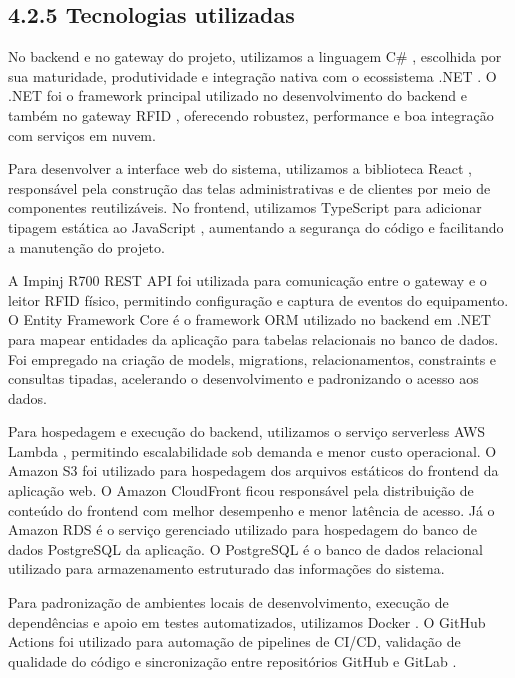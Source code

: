 \hypertarget{__RefHeading___Toc4811_3118176633}{}
\subsection*{4.2.5 Tecnologias utilizadas}
\label{ages-iii:text-h-0085}

No backend e no gateway do projeto, utilizamos a linguagem C\# \cite{ages-iii-csharp}, escolhida por sua maturidade, produtividade e integração nativa com o ecossistema .NET \cite{ages-iii-dotnet}.
O .NET foi o framework principal utilizado no desenvolvimento do backend e também no gateway RFID \cite{ages-iii-rfid-nist}, oferecendo robustez, performance e boa integração com serviços em nuvem.

Para desenvolver a interface web do sistema, utilizamos a biblioteca React \cite{ages-iii-react}, responsável pela construção das telas administrativas e de clientes por meio de componentes reutilizáveis.
No frontend, utilizamos TypeScript \cite{ages-iii-typescript} para adicionar tipagem estática ao JavaScript \cite{ages-iii-javascript}, aumentando a segurança do código e facilitando a manutenção do projeto.

A Impinj R700 REST API \cite{ages-iii-impinj-iot-interface} foi utilizada para comunicação entre o gateway e o leitor RFID físico, permitindo configuração e captura de eventos do equipamento.
O Entity Framework Core \cite{ages-iii-entity-framework} é o framework ORM utilizado no backend em .NET para mapear entidades da aplicação para tabelas relacionais no banco de dados. Foi empregado na criação de models, migrations, relacionamentos, constraints e consultas tipadas, acelerando o desenvolvimento e padronizando o acesso aos dados.

Para hospedagem e execução do backend, utilizamos o serviço serverless AWS Lambda \cite{ages-iii-aws-lambda}, permitindo escalabilidade sob demanda e menor custo operacional.
O Amazon S3 \cite{ages-iii-s3} foi utilizado para hospedagem dos arquivos estáticos do frontend da aplicação web.
O Amazon CloudFront \cite{ages-iii-cloudfront} ficou responsável pela distribuição de conteúdo do frontend com melhor desempenho e menor latência de acesso.
Já o Amazon RDS \cite{ages-iii-rds} é o serviço gerenciado utilizado para hospedagem do banco de dados PostgreSQL \cite{ages-iii-postgresql} da aplicação.
O PostgreSQL é o banco de dados relacional utilizado para armazenamento estruturado das informações do sistema.

Para padronização de ambientes locais de desenvolvimento, execução de dependências e apoio em testes automatizados, utilizamos Docker \cite{ages-iii-docker}.
O GitHub Actions \cite{ages-iii-github-actions} foi utilizado para automação de pipelines de CI/CD, validação de qualidade do código e sincronização entre repositórios GitHub e GitLab \cite{ages-iii-gitlab}.\par
